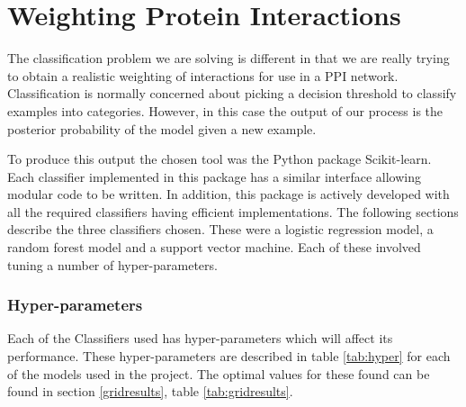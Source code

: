 \section{Weighting Protein Interactions}

The classification problem we are solving is different in that we are really trying to obtain a realistic weighting of interactions for use in a \ac{PPI} network.
Classification is normally concerned about picking a decision threshold to classify examples into categories.
However, in this case the output of our process is the posterior probability of the model given a new example.

To produce this output the chosen tool was the Python package Scikit-learn\autocite{pedregosa_scikit-learn:_2011}.
Each classifier implemented in this package has a similar interface allowing modular code to be written.
In addition, this package is actively developed with all the required classifiers having efficient implementations.
The following sections describe the three classifiers chosen.
These were a logistic regression model, a random forest model and a support vector machine.
Each of these involved tuning a number of hyper-parameters.

\subsubsection*{Hyper-parameters}
Each of the Classifiers used has hyper-parameters which will affect its performance.
These hyper-parameters are described in table \ref{tab:hyper} for each of the models used in the project.
The optimal values for these found can be found in section \ref{gridresults}, table \ref{tab:gridresults}.


